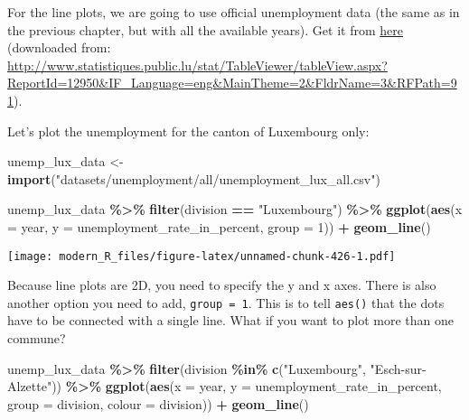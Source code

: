 \documentclass[
]{article}
\newenvironment{Shaded}{\begin{snugshade}}{\end{snugshade}}
\newcommand{\DataTypeTok}[1]{\textcolor[rgb]{0.13,0.29,0.53}{#1}}
\newcommand{\DecValTok}[1]{\textcolor[rgb]{0.00,0.00,0.81}{#1}}
\newcommand{\KeywordTok}[1]{\textcolor[rgb]{0.13,0.29,0.53}{\textbf{#1}}}
\newcommand{\NormalTok}[1]{#1}
\newcommand{\OperatorTok}[1]{\textcolor[rgb]{0.81,0.36,0.00}{\textbf{#1}}}
\newcommand{\StringTok}[1]{\textcolor[rgb]{0.31,0.60,0.02}{#1}}
\begin{document}
For the line plots, we are going to use official unemployment data (the same as in the previous
chapter, but with all the available years). Get it from
\href{https://github.com/b-rodrigues/modern_R/tree/master/datasets/unemployment/all}{here}
(downloaded from:
\url{http://www.statistiques.public.lu/stat/TableViewer/tableView.aspx?ReportId=12950\&IF_Language=eng\&MainTheme=2\&FldrName=3\&RFPath=91}).

Let's plot the unemployment for the canton of Luxembourg only:

\begin{Shaded}
\begin{Highlighting}[]
\NormalTok{unemp\_lux\_data \textless{}{-}}\StringTok{ }\KeywordTok{import}\NormalTok{(}\StringTok{"datasets/unemployment/all/unemployment\_lux\_all.csv"}\NormalTok{)}

\NormalTok{unemp\_lux\_data }\OperatorTok{\%\textgreater{}\%}
\StringTok{  }\KeywordTok{filter}\NormalTok{(division }\OperatorTok{==}\StringTok{ "Luxembourg"}\NormalTok{) }\OperatorTok{\%\textgreater{}\%}
\StringTok{  }\KeywordTok{ggplot}\NormalTok{(}\KeywordTok{aes}\NormalTok{(}\DataTypeTok{x =}\NormalTok{ year, }\DataTypeTok{y =}\NormalTok{ unemployment\_rate\_in\_percent, }\DataTypeTok{group =} \DecValTok{1}\NormalTok{)) }\OperatorTok{+}
\StringTok{  }\KeywordTok{geom\_line}\NormalTok{()}
\end{Highlighting}
\end{Shaded}

\texttt{[image: modern\_R\_files/figure-latex/unnamed-chunk-426-1.pdf]}

Because line plots are 2D, you need to specify the y and x axes. There is also another option you
need to add, \texttt{group\ =\ 1}. This is to tell \texttt{aes()} that the dots have to be connected with a single
line. What if you want to plot more than one commune?

\begin{Shaded}
\begin{Highlighting}[]
\NormalTok{unemp\_lux\_data }\OperatorTok{\%\textgreater{}\%}
\StringTok{  }\KeywordTok{filter}\NormalTok{(division }\OperatorTok{\%in\%}\StringTok{ }\KeywordTok{c}\NormalTok{(}\StringTok{"Luxembourg"}\NormalTok{, }\StringTok{"Esch{-}sur{-}Alzette"}\NormalTok{)) }\OperatorTok{\%\textgreater{}\%}
\StringTok{  }\KeywordTok{ggplot}\NormalTok{(}\KeywordTok{aes}\NormalTok{(}\DataTypeTok{x =}\NormalTok{ year, }\DataTypeTok{y =}\NormalTok{ unemployment\_rate\_in\_percent, }\DataTypeTok{group =}\NormalTok{ division, }\DataTypeTok{colour =}\NormalTok{ division)) }\OperatorTok{+}
\StringTok{  }\KeywordTok{geom\_line}\NormalTok{()}
\end{Highlighting}
\end{Shaded}
\end{document}
